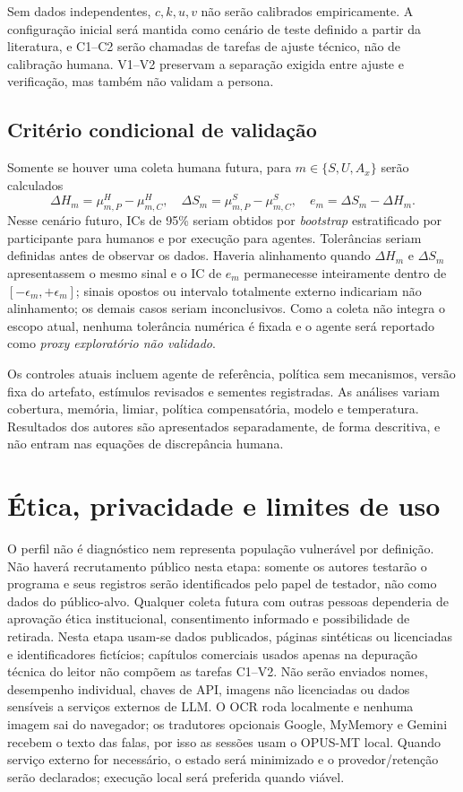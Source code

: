 \documentclass[conference]{IEEEtran}
\begin{document}
Sem dados independentes, $c,k,u,v$ não serão calibrados empiricamente. A configuração inicial será mantida como cenário de teste definido a partir da literatura, e C1--C2 serão chamadas de tarefas de ajuste técnico, não de calibração humana. V1--V2 preservam a separação exigida entre ajuste e verificação, mas também não validam a persona.

\subsection{Critério condicional de validação}
Somente se houver uma coleta humana futura, para $m\in\{S,U,A_x\}$ serão calculados
\begin{equation}
\Delta H_m=\mu^{H}_{m,P}-\mu^{H}_{m,C},\quad
\Delta S_m=\mu^{S}_{m,P}-\mu^{S}_{m,C},\quad
e_m=\Delta S_m-\Delta H_m.
\end{equation}
Nesse cenário futuro, ICs de 95\% seriam obtidos por \emph{bootstrap} estratificado por participante para humanos e por execução para agentes. Tolerâncias seriam definidas antes de observar os dados. Haveria alinhamento quando $\Delta H_m$ e $\Delta S_m$ apresentassem o mesmo sinal e o IC de $e_m$ permanecesse inteiramente dentro de $[-\epsilon_m,+\epsilon_m]$; sinais opostos ou intervalo totalmente externo indicariam não alinhamento; os demais casos seriam inconclusivos. Como a coleta não integra o escopo atual, nenhuma tolerância numérica é fixada e o agente será reportado como \emph{proxy exploratório não validado}.

Os controles atuais incluem agente de referência, política sem mecanismos, versão fixa do artefato, estímulos revisados e sementes registradas. As análises variam cobertura, memória, limiar, política compensatória, modelo e temperatura. Resultados dos autores são apresentados separadamente, de forma descritiva, e não entram nas equações de discrepância humana.

\section{Ética, privacidade e limites de uso}
O perfil não é diagnóstico nem representa população vulnerável por definição. Não haverá recrutamento público nesta etapa: somente os autores testarão o programa e seus registros serão identificados pelo papel de testador, não como dados do público-alvo. Qualquer coleta futura com outras pessoas dependeria de aprovação ética institucional, consentimento informado e possibilidade de retirada. Nesta etapa usam-se dados publicados, páginas sintéticas ou licenciadas e identificadores fictícios; capítulos comerciais usados apenas na depuração técnica do leitor não compõem as tarefas C1--V2. Não serão enviados nomes, desempenho individual, chaves de API, imagens não licenciadas ou dados sensíveis a serviços externos de LLM. O OCR roda localmente e nenhuma imagem sai do navegador; os tradutores opcionais Google, MyMemory e Gemini recebem o texto das falas, por isso as sessões usam o OPUS-MT local. Quando serviço externo for necessário, o estado será minimizado e o provedor/retenção serão declarados; execução local será preferida quando viável.
\end{document}
